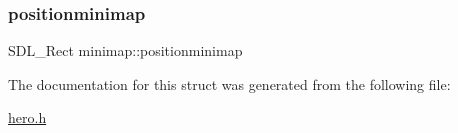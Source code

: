 \mbox{\label{structminimap_a1daef1078e2acbafbf95d9b37471847f}} 
\subsubsection{\texorpdfstring{positionminimap}{positionminimap}}
{\footnotesize\ttfamily S\+D\+L\+\_\+\+Rect minimap\+::positionminimap}



The documentation for this struct was generated from the following file\+:\begin{DoxyCompactItemize}
\item 
\hyperlink{hero_8h}{hero.\+h}\end{DoxyCompactItemize}
